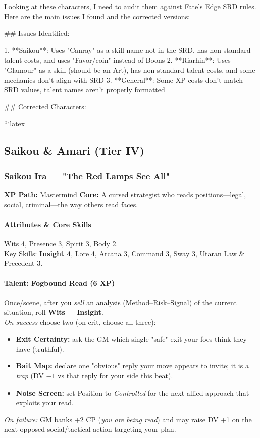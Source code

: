 Looking at these characters, I need to audit them against Fate's Edge SRD rules. Here are the main issues I found and the corrected versions:

## Issues Identified:

1. **Saikou**: Uses "Canray" as a skill name not in the SRD, has non-standard talent costs, and uses "Favor/coin" instead of Boons
2. **Riarhin**: Uses "Glamour" as a skill (should be an Art), has non-standard talent costs, and some mechanics don't align with SRD
3. **General**: Some XP costs don't match SRD values, talent names aren't properly formatted

## Corrected Characters:

```latex

\subsection{Saikou \& Amari (Tier IV)}

\subsubsection{Saikou Ira — "The Red Lamps See All"}
\textbf{XP Path:} Mastermind \quad
\textbf{Core:} A cursed strategist who reads positions—legal, social, criminal—the way others read faces.

\paragraph{Attributes \& Core Skills}
Wits 4, Presence 3, Spirit 3, Body 2.\\
Key Skills: \textbf{Insight 4}, Lore 4, Arcana 3, Command 3, Sway 3, Utaran Law \& Precedent 3.

\paragraph{Talent: Fogbound Read (6 XP)}
Once/scene, after you \emph{sell} an analysis (Method–Risk–Signal) of the current situation, roll \textbf{Wits + Insight}.\\
\emph{On success} choose two (on crit, choose all three):
\begin{itemize}
  \item \textbf{Exit Certainty:} ask the GM which single "safe" exit your foes think they have (truthful).
  \item \textbf{Bait Map:} declare one "obvious" reply your move appears to invite; it is a \emph{trap} (DV $-1$ vs that reply for your side this beat).
  \item \textbf{Noise Screen:} set Position to \emph{Controlled} for the next allied approach that exploits your read.
\end{itemize}
\emph{On failure:} GM banks +2 CP (\emph{you are being read}) and may raise DV +1 on the next opposed social/tactical action targeting your plan.

